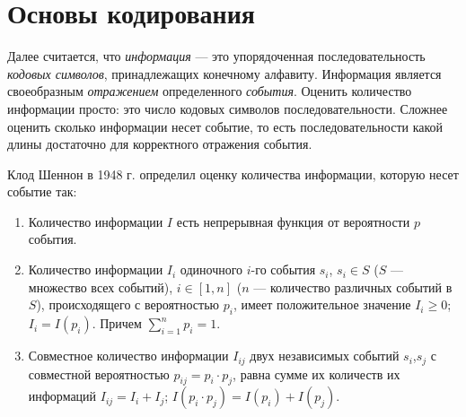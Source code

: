 \chapter{Основы кодирования}

Далее считается, что \emph{информация} --- это упорядоченная последовательность \emph{кодовых символов}, принадлежащих конечному алфавиту. Информация является своеобразным \emph{отражением} определенного \emph{события}. Оценить количество информации просто: это число кодовых символов последовательности. Сложнее оценить сколько информации несет событие, то есть последовательности какой длины достаточно для корректного отражения события. 

Клод Шеннон в 1948 г. определил оценку количества информации, которую несет событие так:
\begin{enumerate}
    \item Количество информации $I$ есть непрерывная функция от вероятности $p$ события. 
    \item Количество информации $I_i$ одиночного $i$-го события $s_i$, $s_i\in S$ ($S$ --- множество всех событий), $i\in[1,n]$ ($n$ --- количество различных событий в $S$), происходящего с вероятностью  $p_i$, имеет положительное значение $I_i\geq 0$;$I_i=I(p_i)$. Причем  $\sum_{i=1}^n p_i=1$.
    \item Совместное количество информации $I_{ij}$ двух независимых событий $s_i$,$s_j$ с совместной вероятностью $p_{ij}=p_i\cdot p_j$, равна сумме их количеств их информаций $I_{ij}=I_i+I_j$; $I(p_i\cdot p_j )=I(p_i )+I(p_j)$.
\end{enumerate}


